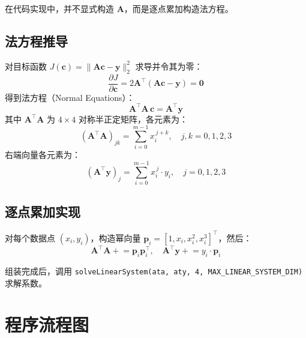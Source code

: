 \documentclass[a4paper,10pt]{article}
\begin{document}
在代码实现中，并不显式构造 $\mathbf{A}$，而是逐点累加构造法方程。

\subsection{法方程推导}

对目标函数 $J(\mathbf{c}) = \|\mathbf{A}\mathbf{c} - \mathbf{y}\|_2^2$ 求导并令其为零：
\begin{equation}
  \frac{\partial J}{\partial \mathbf{c}} = 2\mathbf{A}^{\!\top}(\mathbf{A}\mathbf{c} - \mathbf{y}) = \mathbf{0}
\end{equation}
得到法方程（Normal Equations）：
\begin{equation}\label{eq:normal}
  \boxed{\mathbf{A}^{\!\top}\!\mathbf{A}\,\mathbf{c} = \mathbf{A}^{\!\top}\!\mathbf{y}}
\end{equation}
其中 $\mathbf{A}^{\!\top}\!\mathbf{A}$ 为 $4 \times 4$ 对称半正定矩阵，各元素为：
\begin{equation}
  (\mathbf{A}^{\!\top}\!\mathbf{A})_{jk} = \sum_{i=0}^{m-1} x_i^{\,j+k}, \quad j, k = 0, 1, 2, 3
\end{equation}
右端向量各元素为：
\begin{equation}
  (\mathbf{A}^{\!\top}\!\mathbf{y})_j = \sum_{i=0}^{m-1} x_i^{\,j} \cdot y_i, \quad j = 0, 1, 2, 3
\end{equation}

\subsection{逐点累加实现}

对每个数据点 $(x_i, y_i)$，构造幂向量 $\mathbf{p}_i = [1, x_i, x_i^2, x_i^3]^{\!\top}$，然后：
\begin{equation}
  \mathbf{A}^{\!\top}\!\mathbf{A} \mathrel{+}= \mathbf{p}_i \mathbf{p}_i^{\!\top}, \quad
  \mathbf{A}^{\!\top}\!\mathbf{y} \mathrel{+}= y_i \cdot \mathbf{p}_i
\end{equation}

组装完成后，调用 \texttt{solveLinearSystem(ata, aty, 4, MAX\_LINEAR\_SYSTEM\_DIM)} 求解系数。

\section{程序流程图}
\end{document}
